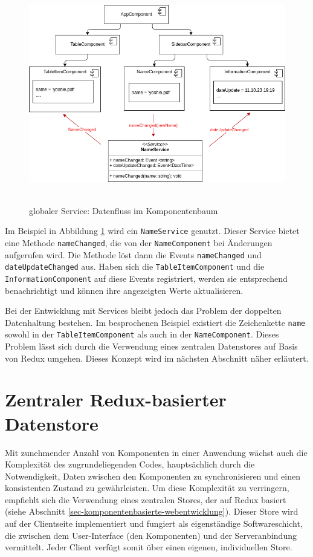 \documentclass[12pt]{book}          %
\begin{document}
\begin{figure}[htbp]
\centering
\includegraphics[height=9.5cm]{abbildungen/components-sync-service.png}
\caption{globaler Service: Datenfluss im Komponentenbaum}
\label{components-sync-service}
\end{figure}

Im Beispiel in Abbildung \ref{components-sync-service} wird ein \texttt{NameService} genutzt. Dieser Service bietet eine Methode \texttt{nameChanged}, die von der \texttt{NameComponent} bei Änderungen aufgerufen wird. Die Methode löst dann die Events \texttt{nameChanged} und \texttt{dateUpdateChanged} aus. Haben sich die \texttt{TableItemComponent} und die \texttt{InformationComponent} auf diese Events registriert, werden sie entsprechend benachrichtigt und können ihre angezeigten Werte aktualisieren.

Bei der Entwicklung mit Services bleibt jedoch das Problem der doppelten Datenhaltung bestehen. Im besprochenen Beispiel existiert die Zeichenkette \texttt{name} sowohl in der \texttt{TableItemComponent} als auch in der \texttt{NameComponent}. Dieses Problem lässt sich durch die Verwendung eines zentralen Datenstores auf Basis von Redux umgehen. Dieses Konzept wird im nächsten Abschnitt näher erläutert.


\section{Zentraler Redux-basierter Datenstore}
\label{sec-zentraler-redux-datenstore}

Mit zunehmender Anzahl von Komponenten in einer Anwendung wächst auch die Komplexität des zugrundeliegenden Codes, hauptsächlich durch die Notwendigkeit, Daten zwischen den Komponenten zu synchronisieren und einen konsistenten Zustand zu gewährleisten. Um diese Komplexität zu verringern, empfiehlt sich die Verwendung eines zentralen Stores, der auf Redux basiert (siehe Abschnitt \ref{sec-komponentenbasierte-webentwicklung}). Dieser Store wird auf der Clientseite implementiert und fungiert als eigenständige Softwareschicht, die zwischen dem User-Interface (den Komponenten) und der Serveranbindung vermittelt. Jeder Client verfügt somit über einen eigenen, individuellen Store.
\end{document}
